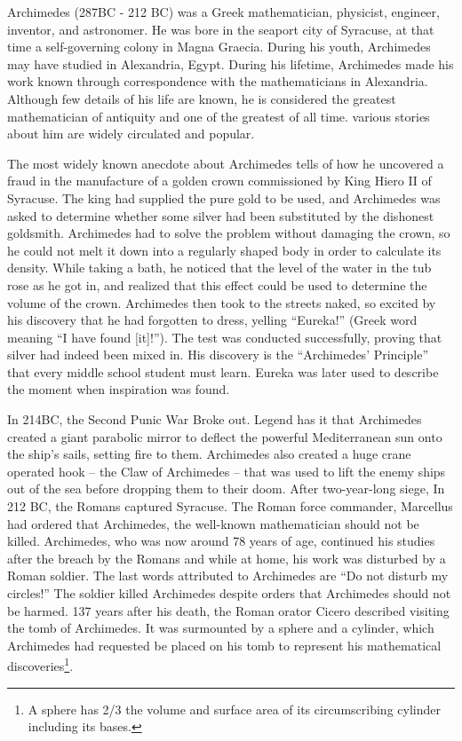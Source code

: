 \documentclass{article}
\begin{document}
Archimedes (287BC - 212 BC) was a Greek mathematician, physicist, engineer, inventor, and astronomer. He was bore in the seaport city of Syracuse, at that time a self-governing colony in Magna Graecia. During his youth, Archimedes may have studied in Alexandria, Egypt. During his lifetime, Archimedes made his work known through correspondence with the mathematicians in Alexandria. Although few details of his life are known, he is considered the greatest mathematician of antiquity and one of the greatest of all time. various stories about him are widely circulated and popular.

The most widely known anecdote about Archimedes tells of how he uncovered a fraud in the manufacture of a golden crown commissioned by King Hiero II of Syracuse. The king had supplied the pure gold to be used, and Archimedes was asked to determine whether some silver had been substituted by the dishonest goldsmith. Archimedes had to solve the problem without damaging the crown, so he could not melt it down into a regularly shaped body in order to calculate its density. While taking a bath, he noticed that the level of the water in the tub rose as he got in, and realized that this effect could be used to determine the volume of the crown. Archimedes then took to the streets naked, so excited by his discovery that he had forgotten to dress, yelling ``Eureka!'' (Greek word meaning ``I have found [it]!''). The test was conducted successfully, proving that silver had indeed been mixed in. His discovery is the ``Archimedes' Principle'' that every middle school student must learn. Eureka was later used to describe the moment when inspiration was found.

In 214BC, the Second Punic War Broke out. Legend has it that Archimedes created a giant parabolic mirror to deflect the powerful Mediterranean sun onto the ship's sails, setting fire to them. Archimedes also created a huge crane operated hook – the Claw of Archimedes – that was used to lift the enemy ships out of the sea before dropping them to their doom. After two-year-long siege, In 212 BC, the Romans captured Syracuse. The Roman force commander, Marcellus had ordered that Archimedes, the well-known mathematician should not be killed. Archimedes, who was now around 78 years of age, continued his studies after the breach by the Romans and while at home, his work was disturbed by a Roman soldier. The last words attributed to Archimedes are ``Do not disturb my circles!'' The soldier killed Archimedes despite orders that Archimedes should not be harmed. 137 years after his death, the Roman orator Cicero described visiting the tomb of Archimedes. It was surmounted by a sphere and a cylinder, which Archimedes had requested be placed on his tomb to represent his mathematical discoveries\footnote{A sphere has 2/3 the volume and surface area of its circumscribing cylinder including its bases.}.
\end{document}
